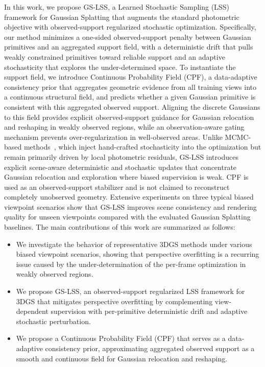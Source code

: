 \documentclass[lettersize,journal]{IEEEtran}
\begin{document}
In this work, we propose GS-LSS, a Learned Stochastic Sampling (LSS) framework for Gaussian Splatting that augments the standard photometric objective with observed-support regularized stochastic optimization.
Specifically, our method minimizes a one-sided observed-support penalty between Gaussian primitives and an aggregated support field, with a deterministic drift that pulls weakly constrained primitives toward reliable support and an adaptive stochasticity that explores the under-determined space.
To instantiate the support field, we introduce Continuous Probability Field (CPF), a data-adaptive consistency prior that aggregates geometric evidence from all training views into a continuous structural field, and predicts whether a given Gaussian primitive is consistent with this aggregated observed support. 
Aligning the discrete Gaussians to this field provides explicit observed-support guidance for Gaussian relocation and reshaping in weakly observed regions, while an observation-aware gating mechanism prevents over-regularization in well-observed areas.
Unlike MCMC-based methods~\cite{mcmc,mh3dgs}, which inject hand-crafted stochasticity into the optimization but remain primarily driven by local photometric residuals, GS-LSS introduces explicit scene-aware deterministic and stochastic updates that concentrate Gaussian relocation and exploration where biased supervision is weak. CPF is used as an observed-support stabilizer and is not claimed to reconstruct completely unobserved geometry.
Extensive experiments on three typical biased viewpoint scenarios show that GS-LSS improves scene consistency and rendering quality for unseen viewpoints compared with the evaluated Gaussian Splatting baselines.
The main contributions of this work are summarized as follows:
\begin{itemize}
    \item We investigate the behavior of representative 3DGS methods under various biased viewpoint scenarios, showing that perspective overfitting is a recurring issue caused by the under-determination of the per-frame optimization in weakly observed regions.
    \item We propose GS-LSS, an observed-support regularized LSS framework for 3DGS that mitigates perspective overfitting by complementing view-dependent supervision with per-primitive deterministic drift and adaptive stochastic perturbation.
    \item We propose a Continuous Probability Field (CPF) that serves as a data-adaptive consistency prior, approximating aggregated observed support as a smooth and continuous field for Gaussian relocation and reshaping.
\end{itemize}
\end{document}
